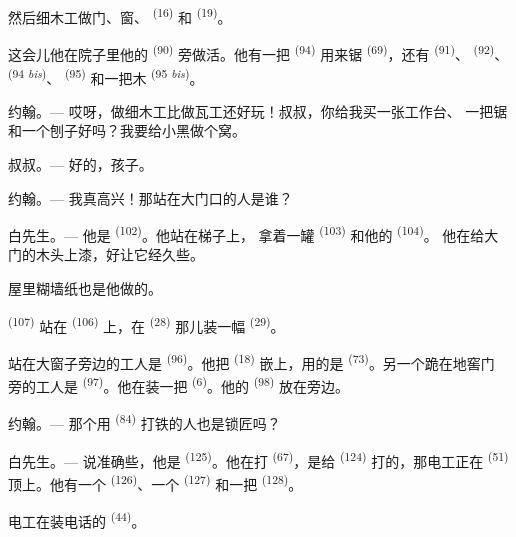 然后细木工做门、窗、 \textsuperscript{(16)} 和
\textsuperscript{(19)}。

这会儿他在院子里他的 \textsuperscript{(90)} 旁做活。他有一把
 \textsuperscript{(94)} 用来锯 \textsuperscript{(69)}，还有
 \textsuperscript{(91)}、 \textsuperscript{(92)}、
 \textsuperscript{(94 \textit{bis})}、 \textsuperscript{(95)}
和一把木 \textsuperscript{(95 \textit{bis})}。

\textsc{约翰}。--- 哎呀，做细木工比做瓦工还好玩！叔叔，你给我买一张工作台、
一把锯和一个刨子好吗？我要给小黑做个窝。

\textsc{叔叔}。--- 好的，孩子。

\textsc{约翰}。--- 我真高兴！那站在大门口的人是谁？

\VUsaut{3.0mm}
\VUsaut{3.0mm}

\textsc{白先生}。--- 他是 \textsuperscript{(102)}。他站在梯子上，
拿着一罐 \textsuperscript{(103)} 和他的 \textsuperscript{(104)}。
他在给大门的木头上漆，好让它经久些。

屋里糊墙纸也是他做的。

 \textsuperscript{(107)} 站在 \textsuperscript{(106)}
上，在 \textsuperscript{(28)} 那儿装一幅 \textsuperscript{(29)}。

站在大窗子旁边的工人是 \textsuperscript{(96)}。他把 \textsuperscript{(18)} 嵌上，用的是
 \textsuperscript{(73)}。另一个跪在地窖门
旁的工人是 \textsuperscript{(97)}。他在装一把
\textsuperscript{(6)}。他的 \textsuperscript{(98)} 放在旁边。

\textsc{约翰}。--- 那个用 \textsuperscript{(84)} 打铁的人也是锁匠吗？

\textsc{白先生}。--- 说准确些，他是 \textsuperscript{(125)}。他在打 \textsuperscript{(67)}，是给
 \textsuperscript{(124)} 打的，那电工正在
\textsuperscript{(51)} 顶上。他有一个
\textsuperscript{(126)}、一个 \textsuperscript{(127)} 和一把
\textsuperscript{(128)}。

电工在装电话的 \textsuperscript{(44)}。

